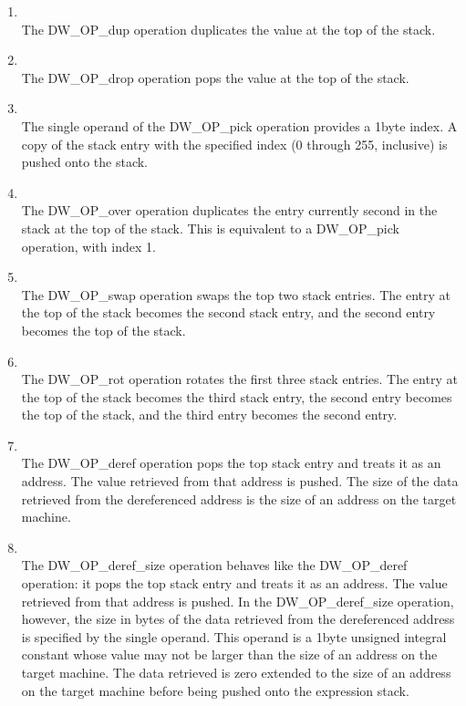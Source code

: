 \begin{enumerate}[1]
\item {} \\
The DW\-\_OP\-\_dup operation duplicates the value at the top of the stack.

\item {} \\
The DW\-\_OP\-\_drop operation pops the value at the top of the stack.

\item {} \\
The single operand of the DW\-\_OP\-\_pick operation provides a
1\dash byte index. A copy of the stack entry with the specified
index (0 through 255, inclusive) is pushed onto the stack.

\item {} \\
The DW\-\_OP\-\_over operation duplicates the entry currently second
in the stack at the top of the stack. 
This is equivalent to
a DW\-\_OP\-\_pick operation, with index 1.  

\item {} \\
The DW\-\_OP\-\_swap operation swaps the top two stack entries. 
The entry at the top of the
stack becomes the second stack entry, 
and the second entry becomes the top of the stack.

\item {} \\
The DW\-\_OP\-\_rot operation rotates the first three stack
entries. The entry at the top of the stack becomes the third
stack entry, the second entry becomes the top of the stack,
and the third entry becomes the second entry.

\item  {} \\
The DW\-\_OP\-\_deref operation pops the top stack entry and 
treats it as an address. The value
retrieved from that address is pushed. 
The size of the data retrieved from the dereferenced
address is the size of an address on the target machine.

\item {} \\
The DW\-\_OP\-\_deref\-\_size operation behaves like the DW\-\_OP\-\_deref
operation: it pops the top stack entry and treats it as an
address. The value retrieved from that address is pushed. In
the DW\-\_OP\-\_deref\-\_size operation, however, the size in bytes
of the data retrieved from the dereferenced address is
specified by the single operand. This operand is a 1\dash byte
unsigned integral constant whose value may not be larger
than the size of an address on the target machine. The data
retrieved is zero extended to the size of an address on the
target machine before being pushed onto the expression stack.


\end{enumerate}
